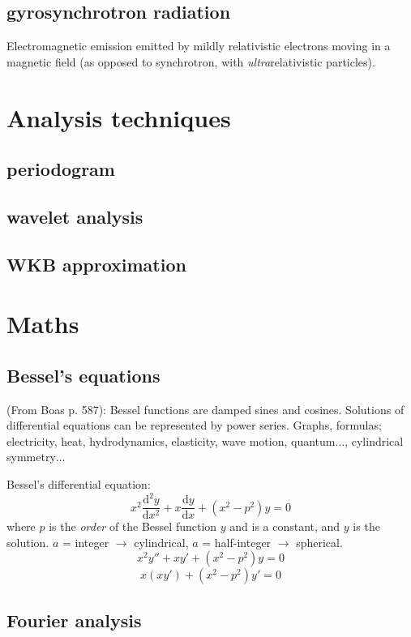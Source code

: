 \documentclass{article}
\begin{document}
\subsection{gyrosynchrotron radiation}
Electromagnetic emission emitted by mildly relativistic electrons moving
in a magnetic field
(as opposed to synchrotron, with \emph{ultra}relativistic particles).


\section{Analysis techniques}
\subsection{periodogram}
\subsection{wavelet analysis}
\subsection{WKB approximation}


\section{Maths}
\subsection{Bessel's equations}

(From Boas p. 587): Bessel functions are damped sines and cosines.
Solutions of differential equations can be represented by power series.
Graphs, formulas; electricity, heat, hydrodynamics, elasticity, wave motion,
quantum$\ldots$, cylindrical symmetry$\ldots$

Bessel's differential equation:
\[
    x^{2}\frac{\mathrm{d}^{2}y}{\mathrm{d}x^{2}} +
    x\frac{\mathrm{d}y}{\mathrm{d}x} +
    \left( x^{2}-p^{2} \right) y
    = 0
    \]
where ${p}$ is the \emph{order} of the Bessel function ${y}$ and is a constant, and
${y}$ is the solution.
${a}$ = integer $\rightarrow$ cylindrical,
${a}$ = half-integer $\rightarrow$ spherical.
\[
    x^{2}y'' + xy' + \left( x^{2}-p^{2} \right) y = 0
    \]
\[
    x\left(xy'\right) + \left(x^{2}-p^{2} \right) y' = 0
    \]

\subsection{Fourier analysis}
\end{document}
